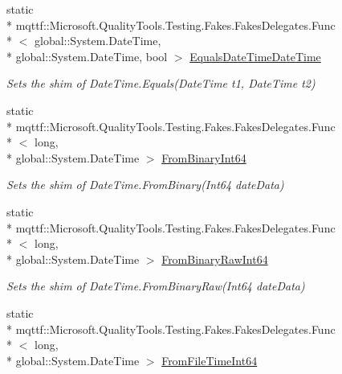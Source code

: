 \begin{DoxyCompactItemize}
static \\*
mqttf\-::\-Microsoft.\-Quality\-Tools.\-Testing.\-Fakes.\-Fakes\-Delegates.\-Func\\*
$<$ global\-::\-System.\-Date\-Time, \\*
global\-::\-System.\-Date\-Time, bool $>$ \hyperlink{class_system_1_1_fakes_1_1_shim_date_time_a98a7af890ef4091653c726a02fd60f0d}{Equals\-Date\-Time\-Date\-Time}
\begin{DoxyCompactList}\small\item\em Sets the shim of Date\-Time.\-Equals(\-Date\-Time t1, Date\-Time t2)\end{DoxyCompactList}\item 
static \\*
mqttf\-::\-Microsoft.\-Quality\-Tools.\-Testing.\-Fakes.\-Fakes\-Delegates.\-Func\\*
$<$ long, \\*
global\-::\-System.\-Date\-Time $>$ \hyperlink{class_system_1_1_fakes_1_1_shim_date_time_a4fc5043f5c4ea589b4615ac0d93863f3}{From\-Binary\-Int64}
\begin{DoxyCompactList}\small\item\em Sets the shim of Date\-Time.\-From\-Binary(\-Int64 date\-Data)\end{DoxyCompactList}\item 
static \\*
mqttf\-::\-Microsoft.\-Quality\-Tools.\-Testing.\-Fakes.\-Fakes\-Delegates.\-Func\\*
$<$ long, \\*
global\-::\-System.\-Date\-Time $>$ \hyperlink{class_system_1_1_fakes_1_1_shim_date_time_a1c868821399da399d6c28f75eef96ed4}{From\-Binary\-Raw\-Int64}
\begin{DoxyCompactList}\small\item\em Sets the shim of Date\-Time.\-From\-Binary\-Raw(\-Int64 date\-Data)\end{DoxyCompactList}\item 
static \\*
mqttf\-::\-Microsoft.\-Quality\-Tools.\-Testing.\-Fakes.\-Fakes\-Delegates.\-Func\\*
$<$ long, \\*
global\-::\-System.\-Date\-Time $>$ \hyperlink{class_system_1_1_fakes_1_1_shim_date_time_affb1f8293885a58d8170931a695cfed6}{From\-File\-Time\-Int64}

\end{DoxyCompactItemize}
